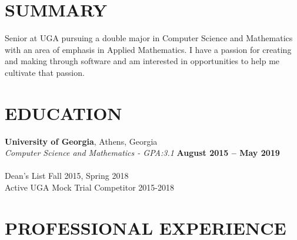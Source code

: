 \documentclass[margin,line]{resume}
\begin{document}
\begin{resume}

    \vspace{-3mm}

    \section{\mysidestyle \textbf{\large{S}\small{UMMARY}}}

    Senior at UGA pursuing a double major in Computer Science and Mathematics with an area
    of emphasis in Applied Mathematics. I have a passion for creating and making through software and am interested in opportunities to help me cultivate that passion.

    \vspace{-1mm}

\sectionline

    \section{\mysidestyle \textbf{\large{E}\small{DUCATION}}}

    \textbf{\listing University of Georgia}, Athens, Georgia \vspace{1mm}\\
    \textsl{Computer Science and Mathematics - GPA:3.1} \hfill \textbf{August 2015 -- May 2019}\vspace{-3mm}\\\vspace{-1mm}%
	\\Dean's List Fall 2015, Spring 2018
	\\Active UGA Mock Trial Competitor 2015-2018 

    \vspace{-1mm}

	\sectionline

    \section{\mysidestyle \textbf{\large{P}\small{ROFESSIONAL} \large{E}\small{XPERIENCE}}}


\end{resume}
\end{document}
